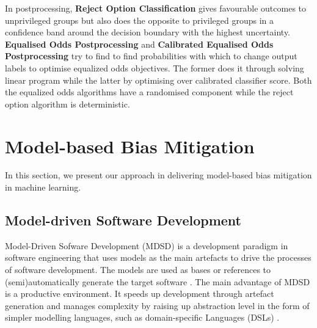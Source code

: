 \documentclass[sigconf,review]{acmart}
\begin{document}

In postprocessing, \textbf{Reject Option Classification} \cite{kamiran2012reject} gives favourable outcomes to unprivileged groups but also does the opposite to privileged groups in a confidence band around the decision boundary with the highest uncertainty.
\textbf{Equalised Odds Postprocessing} \cite{hardt2016equal,pleiss2017equal} and \textbf{Calibrated Equalised Odds Postprocessing} \cite{pleiss2017equal} try to find to find probabilities with which to change output labels to optimise equalized odds objectives. The former does it through solving linear program while the latter by optimising over calibrated classifier score. Both the equalized odds algorithms have a randomised component while the reject option algorithm is deterministic.

\section{Model-based Bias Mitigation}
\label{sec:model_based_bias_mitigation}

In this section, we present our approach in delivering model-based bias mitigation in machine learning. 

\subsection{Model-driven Software Development}
\label{sec:model_based_software_development}
Model-Driven Sofware Development (MDSD) is a development paradigm in software engineering that uses models as the main artefacts to drive the processes of software development. The models are used as bases or references to (semi)automatically generate the target software \cite{brambilla2017model}. The main advantage of MDSD is a productive environment. It speeds up development through artefact generation and manages complexity by raising up abstraction level in the form of simpler modelling languages, such as domain-specific Languages (DSLs) \cite{volter2013model}. 
\end{document}
